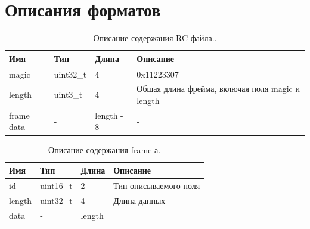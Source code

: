 \documentclass[specification,annotation,times]{itmo-student-thesis}
\begin{document}
\printmainbibliography

\appendix

\chapter{Описания форматов}\label{sec:app:1}

\begin{table}[!ht]
	\caption{Описание содержания RC-файла..}\label{tb1:rc-type}
	\centering
	\begin{tabular}{|p{}|p{}|p{}|p{}|}\hline
		\textbf{Имя} & \textbf{Тип}	&\textbf{Длина}&	\textbf{Описание} \\\hline\hline
		magic	& uint32\_t&	4 &	0x11223307\\\hline
		length	&uint3\_t	&4 &	Общая длина фрейма, включая поля magic и length\\\hline
		frame data&	- &	length - 8	 & -\\\hline
	\end{tabular}
\end{table}

\begin{table}[!ht]
	\caption{Описание содержания frame-а.}\label{tb1:frame-type}
	\centering
	\begin{tabular}{|p{}|p{}|p{}|p{}|}\hline
		\textbf{Имя} & \textbf{Тип}	&\textbf{Длина}&	\textbf{Описание} \\\hline\hline
		id	&uint16\_t&	2 & Тип описываемого поля\\\hline
		length&	uint32\_t	&4	&Длина данных\\\hline
		data&	-	&length	 &\\\hline
		
	\end{tabular}
\end{table}
\end{document}
